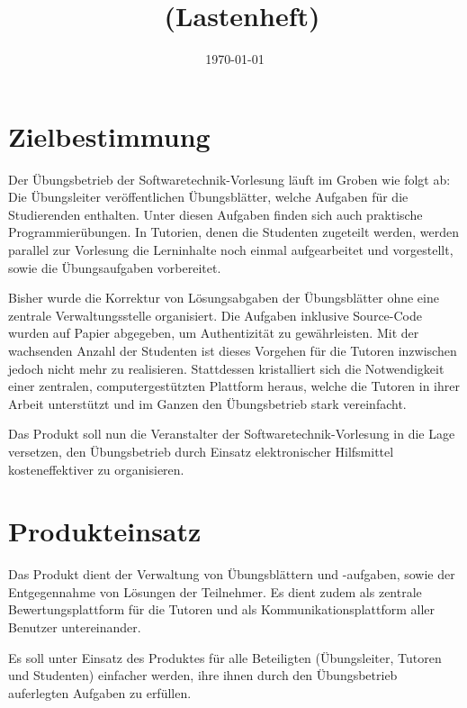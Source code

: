 \documentclass[a4paper,10pt]{article}
\title{\projektName~(Lastenheft)}
\author{\authorName}
\date{\today}
\begin{document}

\tableofcontents          %

\section{Zielbestimmung}

Der Übungsbetrieb der Softwaretechnik-Vorlesung läuft im Groben wie folgt ab: Die Übungsleiter veröffentlichen Übungsblätter, welche Aufgaben für die Studierenden enthalten.  Unter diesen Aufgaben finden sich auch praktische Programmierübungen.  In Tutorien, denen die Studenten zugeteilt werden, werden parallel zur Vorlesung die Lerninhalte noch einmal aufgearbeitet und vorgestellt, sowie die Übungsaufgaben vorbereitet.

Bisher wurde die Korrektur von Lösungsabgaben der Übungsblätter ohne eine zentrale Verwaltungsstelle organisiert.  Die Aufgaben inklusive Source-Code wurden auf Papier abgegeben, um Authentizität zu gewährleisten.  Mit der wachsenden Anzahl der Studenten ist dieses Vorgehen für die Tutoren inzwischen jedoch nicht mehr zu realisieren.  Stattdessen kristalliert sich die Notwendigkeit einer zentralen, computergestützten Plattform heraus, welche die Tutoren in ihrer Arbeit unterstützt und im Ganzen den Übungsbetrieb stark vereinfacht.

Das Produkt soll nun die Veranstalter der Softwaretechnik-Vorlesung in die Lage versetzen, den Übungsbetrieb durch Einsatz elektronischer Hilfsmittel kosteneffektiver zu organisieren.

\section{Produkteinsatz}

Das Produkt dient der Verwaltung von Übungsblättern und -aufgaben, sowie der Entgegennahme von Lösungen der Teilnehmer.  Es dient zudem als zentrale Bewertungsplattform für die Tutoren und als Kommunikationsplattform aller Benutzer untereinander.

Es soll unter Einsatz des Produktes für alle Beteiligten (Übungsleiter, Tutoren und Studenten) einfacher werden, ihre ihnen durch den Übungsbetrieb auferlegten Aufgaben zu erfüllen.
\end{document}

